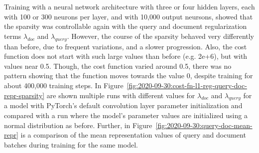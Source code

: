 Training with a neural network architecture with three or four hidden layers, each with 100 or 300 neurons per layer,
    and with 10,000 output neursons, showed that the sparsity was controllable again with 
    the query and document regularization terms $\lambda_{doc}$ and $\lambda_{query}$.
However, the course of the sparsity behaved very differently than before, due to frequent variations,
    and a slower progression.
Also, the cost function does not start with such large values than before (e.g. 2e+6),
    but with values near 0.5.
Though, the cost function varied around 0.5, there was no pattern showing that the function moves 
    towards the value 0, despite training for about 400,000 training steps.
In Figure~\ref{fig:2020-09-30:cost-fn-l1-reg-query-doc-repr-sparsity} are shown multiple runs
    with different values for $\lambda_{doc}$ and $\lambda_{query}$ for a model with PyTorch's 
    default convolution layer parameter initialization and compared with a run where the model's
    parameter values are initialized using a normal distribution as before.
Further, in Figure~\ref{fig:2020-09-30:query-doc-mean-repr} is a comparison of the mean representation values
    of query and document batches during training for the same model.

